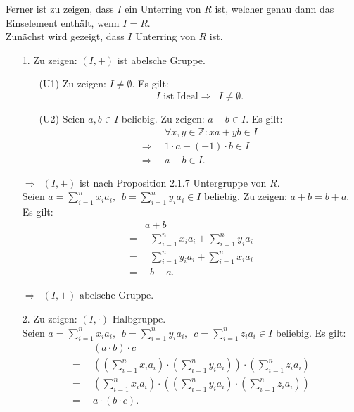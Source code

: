 \documentclass[12pt]{article}
\newcommand{\df}{\Longrightarrow \enspace}
\begin{document}
\begin{enumerate}
	
Ferner ist zu zeigen, dass $I$ ein Unterring von $R$ ist, welcher genau dann das Einselement enthält, wenn $I = R$. \\

Zunächst wird gezeigt, dass $I$ Unterring von $R$ ist.
\begin{enumerate}
\item[1.] Zu zeigen: $(I,+)$ ist abelsche Gruppe.
\begin{enumerate}
	\item[(U1)] Zu zeigen: $I \neq \emptyset$. Es gilt:
	$$I \text{ ist Ideal} \df I \neq \emptyset.$$
	
	\item[(U2)] Seien $a,b \in I$ beliebig. Zu zeigen: $a-b \in I$. Es gilt:
	\begin{align*}
		&\forall x, y \in \mathbb{Z}: x a + y b \in I \\
		\df &1 \cdot a + (-1) \cdot b \in I \\
		\df &a - b \in I.
	\end{align*}
	
\end{enumerate}

$\df (I,+)$ ist nach Proposition 2.1.7 Untergruppe von $R$. \\

Seien $a = \sum\limits_{i=1}^{n}x_i a_i, \enspace b = \sum\limits_{i=1}^{n}y_i a_i \in I$ beliebig. Zu zeigen: $a + b = b + a$. Es gilt:
\begin{align*}
	&a + b \\
	= &\enspace \sum_{i=1}^{n}x_i a_i + \sum_{i=1}^{n}y_i a_i \\
	= &\enspace \sum_{i=1}^{n}y_i a_i + \sum_{i=1}^{n}x_i a_i \\
	= &\enspace b + a.
\end{align*}

$\df (I,+) \text{ abelsche Gruppe}$.

\item[2.] Zu zeigen: $(I,\cdot)$ Halbgruppe. \\
Seien $a = \sum\limits_{i=1}^{n}x_i a_i, \enspace b = \sum\limits_{i=1}^{n}y_i a_i, \enspace c = \sum\limits_{i=1}^{n}z_i a_i \in I$ beliebig. Es gilt:
\begin{align*}
	&(a \cdot b) \cdot c \\
	= \enspace &((\sum_{i=1}^{n}x_i a_i) \cdot (\sum_{i=1}^{n}y_i a_i)) \cdot (\sum_{i=1}^{n}z_i a_i) \\
	= \enspace &(\sum_{i=1}^{n}x_i a_i) \cdot ((\sum_{i=1}^{n}y_i a_i) \cdot (\sum_{i=1}^{n}z_i a_i)) \\
	= \enspace &a \cdot (b \cdot c).
\end{align*}


\end{enumerate}
\end{enumerate}
\end{document}
